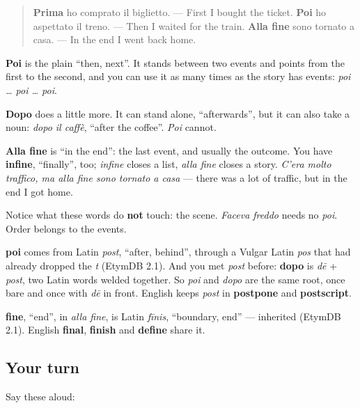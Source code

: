 \begin{grammarlens}[title={Grammar Lens: three places in a story}]
\begin{quote}
\textbf{Prima} ho comprato il biglietto. — First I bought the ticket. \textbf{Poi} ho aspettato il treno. — Then I waited for the train. \textbf{Alla fine} sono tornato a casa. — In the end I went back home.
\end{quote}

\textbf{Poi} is the plain \textquotedblleft{}then, next\textquotedblright{}. It stands between two events and points from the first to the second, and you can use it as many times as the story has events: \emph{poi … poi … poi}.

\textbf{Dopo} does a little more. It can stand alone, \textquotedblleft{}afterwards\textquotedblright{}, but it can also take a noun: \emph{dopo il caffè}, \textquotedblleft{}after the coffee\textquotedblright{}. \emph{Poi} cannot.

\textbf{Alla fine} is \textquotedblleft{}in the end\textquotedblright{}: the last event, and usually the outcome. You have \textbf{infine}, \textquotedblleft{}finally\textquotedblright{}, too; \emph{infine} closes a list, \emph{alla fine} closes a story. \emph{C'era molto traffico, ma alla fine sono tornato a casa} — there was a lot of traffic, but in the end I got home.

Notice what these words do \textbf{not} touch: the scene. \emph{Faceva freddo} needs no \emph{poi}. Order belongs to the events.
\end{grammarlens}

\begin{cousinweb}
\textbf{poi} comes from Latin \emph{post}, \textquotedblleft{}after, behind\textquotedblright{}, through a Vulgar Latin \emph{pos} that had already dropped the \emph{t} (EtymDB 2.1). And you met \emph{post} before: \textbf{dopo} is \emph{dē} + \emph{post}, two Latin words welded together. So \emph{poi} and \emph{dopo} are the same root, once bare and once with \emph{dē} in front. English keeps \emph{post} in \textbf{postpone} and \textbf{postscript}.

\textbf{fine}, \textquotedblleft{}end\textquotedblright{}, in \emph{alla fine}, is Latin \emph{fīnis}, \textquotedblleft{}boundary, end\textquotedblright{} — inherited (EtymDB 2.1). English \textbf{final}, \textbf{finish} and \textbf{define} share it.
\end{cousinweb}

\subsection*{Your turn}
Say these aloud:


